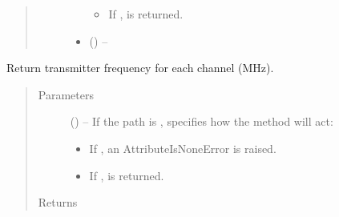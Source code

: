 \documentclass[letterpaper,10pt,english]{sphinxmanual}
\begin{document}
\begin{fulllineitems}
\begin{fulllineitems}
\begin{quote}
\begin{description}
\begin{itemize}
\begin{itemize}
\item {} 
\sphinxAtStartPar
If ,  is returned.

\end{itemize}


\item {} 
\sphinxAtStartPar
{} (\sphinxstyleliteralemphasis{\sphinxupquote{, }}) – 

\end{itemize}

\end{description}\end{quote}

\end{fulllineitems}


\begin{fulllineitems}
\label{\detokenize{references/core:nmrespy.core.Estimator.get_sfo}}
\sphinxAtStartPar
Return transmitter frequency for each channel (MHz).
\begin{quote}\begin{description}
\item[{Parameters}] \leavevmode
\sphinxAtStartPar
{} (\sphinxstyleliteralemphasis{\sphinxupquote{, }}) – 
\sphinxAtStartPar
If the path is ,  specifies how the method will act:
\begin{itemize}
\item {} 
\sphinxAtStartPar
If , an AttributeIsNoneError is raised.

\item {} 
\sphinxAtStartPar
If ,  is returned.

\end{itemize}


\item[{Returns}] \leavevmode
\sphinxAtStartPar
{}


\end{description}
\end{quote}
\end{fulllineitems}
\end{fulllineitems}
\end{document}

